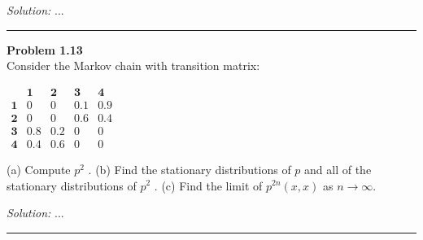 \documentclass[a4paper, 11pt]{article}
\newenvironment{problem}[2][Problem]
    { \begin{mdframed}[backgroundcolor=gray!20] \textbf{#1 #2} \\}
    {  \end{mdframed}}
\newenvironment{solution}
    {\textit{Solution:}}
    {}
\begin{document}
\begin{solution}
    ...
\end{solution}

\noindent\rule{7in}{2.8pt}

\begin{problem}{1.13}
    Consider the Markov chain with transition matrix:
    \begin{center}
		$
		\begin{matrix}
		& \bm{1} & \bm{2} & \bm{3} & \bm{4} \\ 
		\bm{1}	&0		&0		&0.1	&0.9		\\
		\bm{2}	&0		&0		&0.6	&0.4		\\
		\bm{3}	&0.8	&0.2	&0		&0			\\
		\bm{4}	&0.4	&0.6	&0		&0					
		\end{matrix}
		$
	\end{center}
   (a) Compute $p^2$ . (b) Find the stationary distributions of $p$ and all of the stationary distributions of
    $p^2$ . (c) Find the limit of $p^{2n} (x, x)$ as $n \rightarrow \infty$.
\end{problem}
\begin{solution}
    ...
\end{solution}

\noindent\rule{7in}{2.8pt}
\end{document}
